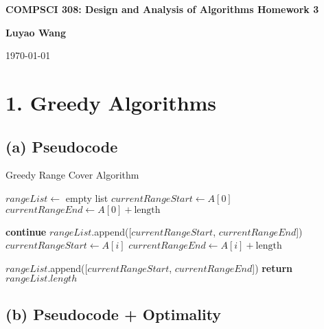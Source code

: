 \documentclass[10pt]{article}
\begin{document}

\begin{center}
  {\Large \bf COMPSCI 308: Design and Analysis of Algorithms Homework 3}
  \vspace{2mm}

  {\bf Luyao Wang}

  {\today}
\end{center}

\section*{1. Greedy Algorithms}
\subsection*{(a) Pseudocode}

\begin{algorithm}[H]
  \caption{Greedy Range Cover Algorithm}
  \begin{algorithmic}[1]
    \State $rangeList \gets$ empty list
    \State $currentRangeStart \gets A[0]$
    \State $currentRangeEnd \gets A[0] + \text{length}$

    \State \textbf{continue}
    \Else
    \State $rangeList$.append([$currentRangeStart$, $currentRangeEnd$])
    \State $currentRangeStart \gets A[i]$
    \State $currentRangeEnd \gets A[i] + \text{length}$
    \EndIf
    \EndFor

    \State $rangeList$.append([$currentRangeStart$, $currentRangeEnd$])
    \State \textbf{return} $rangeList.length$
    \EndFunction
  \end{algorithmic}
\end{algorithm}

\subsection*{(b) Pseudocode + Optimality}
\end{document}
